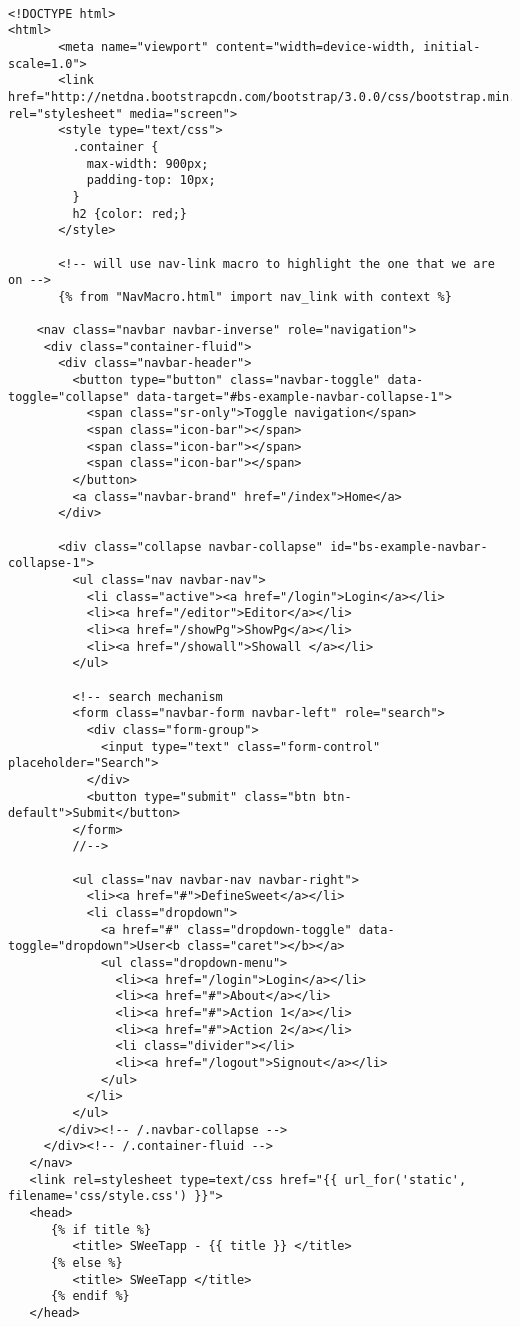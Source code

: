 \documentclass[11pt]{article}
\begin{document}
\begin{verbatim}

<!DOCTYPE html>
<html>
       <meta name="viewport" content="width=device-width, initial-scale=1.0">
       <link href="http://netdna.bootstrapcdn.com/bootstrap/3.0.0/css/bootstrap.min.css" rel="stylesheet" media="screen">
       <style type="text/css">
         .container {
           max-width: 900px;
           padding-top: 10px;
         }
         h2 {color: red;}
       </style>

       <!-- will use nav-link macro to highlight the one that we are on -->
       {% from "NavMacro.html" import nav_link with context %}

    <nav class="navbar navbar-inverse" role="navigation">
     <div class="container-fluid">
       <div class="navbar-header">
         <button type="button" class="navbar-toggle" data-toggle="collapse" data-target="#bs-example-navbar-collapse-1">
           <span class="sr-only">Toggle navigation</span>
           <span class="icon-bar"></span>
           <span class="icon-bar"></span>
           <span class="icon-bar"></span>
         </button>
         <a class="navbar-brand" href="/index">Home</a>
       </div>

       <div class="collapse navbar-collapse" id="bs-example-navbar-collapse-1">
         <ul class="nav navbar-nav">
           <li class="active"><a href="/login">Login</a></li>
           <li><a href="/editor">Editor</a></li>
           <li><a href="/showPg">ShowPg</a></li>
           <li><a href="/showall">Showall </a></li>
         </ul>

         <!-- search mechanism
         <form class="navbar-form navbar-left" role="search">
           <div class="form-group">
             <input type="text" class="form-control" placeholder="Search">
           </div>
           <button type="submit" class="btn btn-default">Submit</button>
         </form>
         //-->

         <ul class="nav navbar-nav navbar-right">
           <li><a href="#">DefineSweet</a></li>
           <li class="dropdown">
             <a href="#" class="dropdown-toggle" data-toggle="dropdown">User<b class="caret"></b></a>
             <ul class="dropdown-menu">
               <li><a href="/login">Login</a></li>
               <li><a href="#">About</a></li>
               <li><a href="#">Action 1</a></li>
               <li><a href="#">Action 2</a></li>
               <li class="divider"></li>
               <li><a href="/logout">Signout</a></li>
             </ul>
           </li>
         </ul>
       </div><!-- /.navbar-collapse -->
     </div><!-- /.container-fluid -->
   </nav>
   <link rel=stylesheet type=text/css href="{{ url_for('static', filename='css/style.css') }}">
   <head> 
      {% if title %}
         <title> SWeeTapp - {{ title }} </title>
      {% else %}
         <title> SWeeTapp </title>
      {% endif %}     
   </head>


\end{verbatim}
\end{document}
